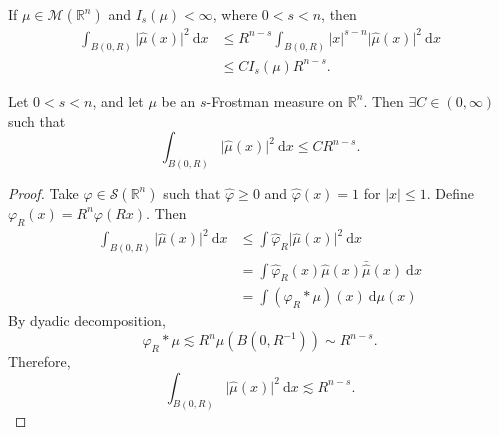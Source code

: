 If $\mu \in \mathcal{M}(\mathbb{R}^{n})$ and $I_{s}(\mu)<\infty$, where $0<s<n$, then
\begin{equation}\label{eq:mu_bound}
\begin{aligned}
\int _{B(0,R)}\lvert \hat{\mu}(x) \rvert ^{2}\ \mathrm{d}x & \leq R^{n-s}\int _{B(0,R)}\lvert x \rvert ^{s-n}\lvert \hat{\mu}(x) \rvert ^{2}\ \mathrm{d}x \\
 & \leq CI_{s}(\mu)R^{n-s}.
\end{aligned}
\end{equation}

\begin{lemma}\label{lem:3.4}
Let $0<s<n$, and let $\mu$ be an $s$-Frostman measure on $\mathbb{R}^{n}$. Then $\exists C \in(0,\infty)$ such that
$$
\int _{B(0,R)}\lvert \hat{\mu}(x) \rvert^{2}\ \mathrm{d}x\leq CR^{n-s}.
$$
\end{lemma}
\begin{proof}
Take $\varphi \in \mathscr{S}(\mathbb{R}^{n})$ such that $\hat{\varphi}\geq 0$ and $\hat{\varphi}(x)=1$ for $\lvert x \rvert\leq 1$. Define $\varphi _{R}(x)=R^{n}\varphi(Rx)$. Then
$$
\begin{aligned}
\int _{B(0,R)}\lvert \hat{\mu}(x) \rvert ^{2}\ \mathrm{d}x & \leq \int \hat{\varphi}_{R}\lvert \hat{\mu}(x) \rvert ^{2}\ \mathrm{d}x \\
 & =\int \hat{\varphi}_{R}(x)\hat{\mu}(x)\bar{\hat{\mu}}(x)\ \mathrm{d}x \\
 & =\int(\varphi _{R}* \mu)(x)\ \mathrm{d}\mu(x)
\end{aligned}
$$
By dyadic decomposition,
$$
\varphi _{R}* \mu\lesssim R^{n}\mu(B(0,R^{-1}))\sim R^{n-s}.
$$
Therefore,
$$
\int _{B(0,R)}\lvert \hat{\mu}(x) \rvert ^{2}\ \mathrm{d}x\lesssim R^{n-s}.
$$
\end{proof}

